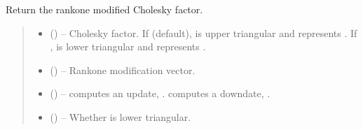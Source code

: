 \documentclass[a4paper,11pt,english]{sphinxmanual}
\begin{document}
\begin{fulllineitems}
\label{\detokenize{generated/cholrot.update:cholrot.update}}
\pysigstartsignatures
\pysiglinewithargsret
{}
{\sphinxparamcomma {}\sphinxparamcomma {}\sphinxparamcomma {}\sphinxparamcomma {}\sphinxparamcomma {}\sphinxparamcomma {}\sphinxparamcomma {}}
{}
\pysigstopsignatures
\sphinxAtStartPar
Return the rank\sphinxhyphen{}one modified Cholesky factor.
\begin{quote}\begin{description}
\begin{itemize}
\item {} 
\sphinxAtStartPar
{} () – Cholesky factor. If  (default),  is upper triangular
and represents . If ,  is lower
triangular and represents .

\item {} 
\sphinxAtStartPar
{} () – Rank\sphinxhyphen{}one modification vector.

\item {} 
\sphinxAtStartPar
{} () –  computes an update, .  computes a downdate,
.

\item {} 
\sphinxAtStartPar
{} () – Whether  is lower triangular.


\end{itemize}
\end{description}
\end{quote}
\end{fulllineitems}
\end{document}

